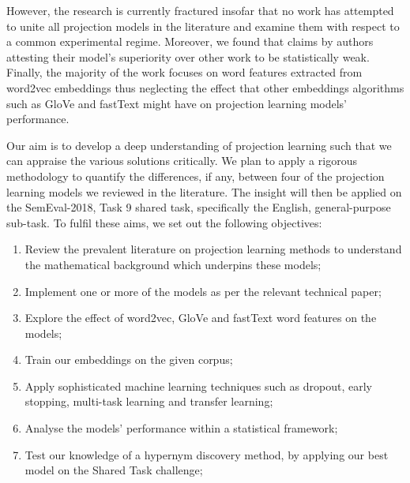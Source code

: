 However, the research is currently fractured insofar that no work has attempted to unite all projection models in the literature and examine them with respect to a common experimental regime.  Moreover, we found that claims by authors attesting their model's superiority over other work to be statistically weak. Finally, the majority of the work focuses on word features extracted from word2vec embeddings thus neglecting the effect that other embeddings algorithms such as GloVe and fastText might have on projection learning models' performance.

Our aim is to develop a deep understanding of projection learning such that we can appraise the various solutions critically.  We plan to apply a rigorous methodology to quantify the differences, if any, between four of the projection learning models we reviewed in the literature.  The insight will then be applied on the SemEval-2018, Task 9 shared task, specifically the English, general-purpose sub-task.  To fulfil these aims, we set out the following objectives:
\begin{enumerate}
    \item Review the prevalent literature on projection learning methods to understand the mathematical background which underpins these models;
    \item Implement one or more of the models as per the relevant technical paper;
    \item Explore the effect of word2vec, GloVe and fastText word features on the models;
    \item Train our embeddings on the given corpus;
    \item Apply sophisticated machine learning techniques such as dropout, early stopping, multi-task learning and transfer learning;
    \item Analyse the models' performance within a statistical framework;
    \item Test our knowledge of a hypernym discovery method, by applying our best model on the Shared Task challenge;
\end{enumerate}

